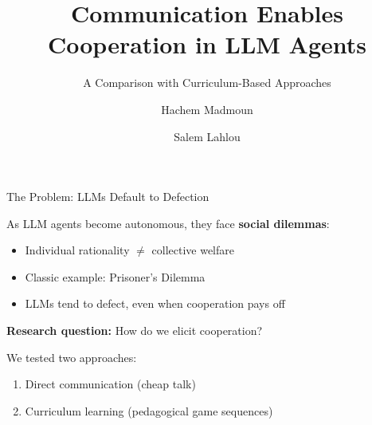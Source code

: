 \documentclass[aspectratio=169]{beamer}
\title{Communication Enables Cooperation in LLM Agents}
\subtitle{A Comparison with Curriculum-Based Approaches}
\author{Hachem Madmoun \and Salem Lahlou}
\institute{Mohamed bin Zayed University of Artificial Intelligence}
\date{}
\begin{document}
\begin{frame}
  \titlepage

\end{frame}

\begin{frame}{The Problem: LLMs Default to Defection}
  
  \vspace{1em}
  As LLM agents become autonomous, they face \textbf{social dilemmas}:
  
  \vspace{1em}
  \begin{itemize}
    \item Individual rationality $\neq$ collective welfare
    \item Classic example: Prisoner's Dilemma
    \item LLMs tend to defect, even when cooperation pays off
  \end{itemize}
  
  \vspace{1.5em}
  \textbf{Research question:} How do we elicit cooperation?
  
  \vspace{1em}
  We tested two approaches:
  \begin{enumerate}
    \item Direct communication (cheap talk)
    \item Curriculum learning (pedagogical game sequences)
  \end{enumerate}

\end{frame}
\end{document}

